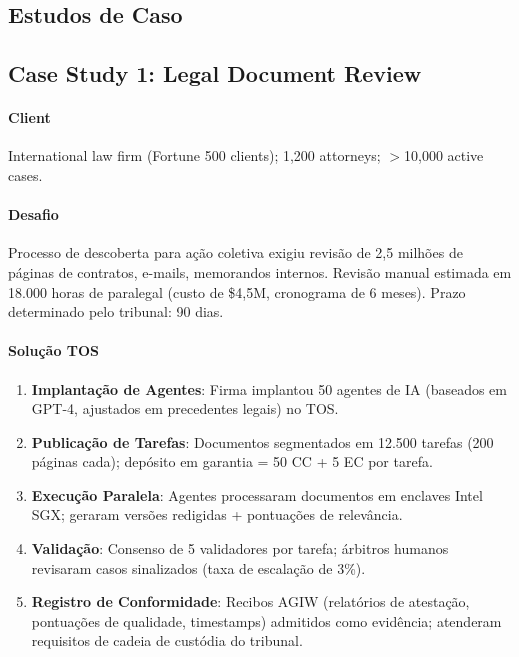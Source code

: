 \documentclass[11pt]{article}
\begin{document}
\begin{itemize}[noitemsep]
\begin{itemize}[noitemsep]
\begin{itemize}[noitemsep]
\section{Estudos de Caso}
\label{sec:case-studies}

\subsection{Case Study 1: Legal Document Review}

\paragraph{Client} International law firm (Fortune 500 clients); 1,200 attorneys; $>$10,000 active cases.

\paragraph{Desafio} Processo de descoberta para ação coletiva exigiu revisão de 2,5 milhões de páginas de contratos, e-mails, memorandos internos. Revisão manual estimada em 18.000 horas de paralegal (custo de \$4,5M, cronograma de 6 meses). Prazo determinado pelo tribunal: 90 dias.

\paragraph{Solução TOS}
\begin{enumerate}[noitemsep]
  \item \textbf{Implantação de Agentes}: Firma implantou 50 agentes de IA (baseados em GPT-4, ajustados em precedentes legais) no TOS.
  \item \textbf{Publicação de Tarefas}: Documentos segmentados em 12.500 tarefas (200 páginas cada); depósito em garantia = 50 CC + 5 EC por tarefa.
  \item \textbf{Execução Paralela}: Agentes processaram documentos em enclaves Intel SGX; geraram versões redigidas + pontuações de relevância.
  \item \textbf{Validação}: Consenso de 5 validadores por tarefa; árbitros humanos revisaram casos sinalizados (taxa de escalação de 3\%).
  \item \textbf{Registro de Conformidade}: Recibos AGIW (relatórios de atestação, pontuações de qualidade, timestamps) admitidos como evidência; atenderam requisitos de cadeia de custódia do tribunal.
\end{enumerate}


\end{itemize}
\end{itemize}
\end{itemize}
\end{document}
